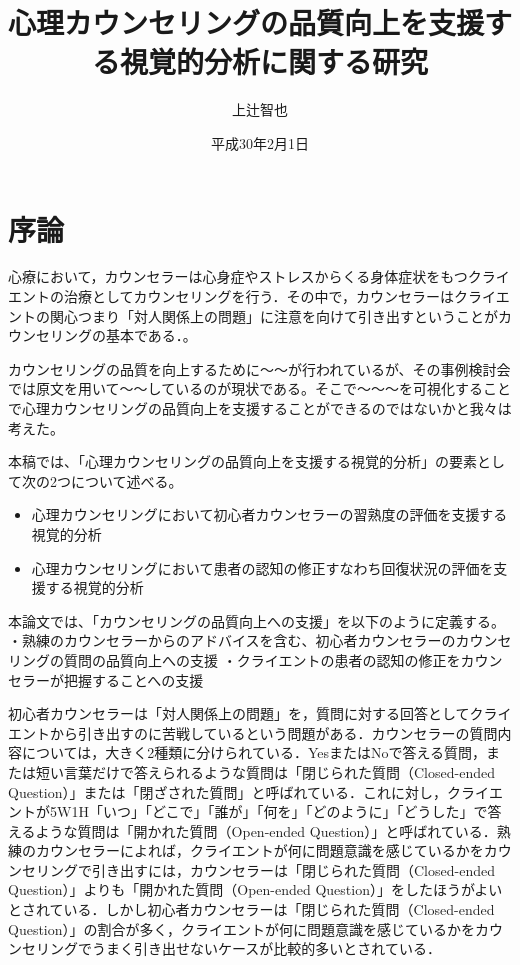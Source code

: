 \documentclass[shuuron]{kuee}
\title{心理カウンセリングの品質向上を支援する視覚的分析に関する研究}
\author{上辻智也}
\date{平成30年2月1日}
\begin{document}
\maketitle
\tableofcontents


\chapter{序論}
心療において，カウンセラーは心身症やストレスからくる身体症状をもつクライエントの治療としてカウンセリングを行う．その中で，カウンセラーはクライエントの関心つまり「対人関係上の問題」に注意を向けて引き出すということがカウンセリングの基本である\cite{zokad}．。




カウンセリングの品質を向上するために〜〜が行われているが、その事例検討会では原文を用いて〜〜しているのが現状である。そこで〜〜〜を可視化することで心理カウンセリングの品質向上を支援することができるのではないかと我々は考えた。

本稿では、「心理カウンセリングの品質向上を支援する視覚的分析」の要素として次の2つについて述べる。
\begin{itemize}
\item 心理カウンセリングにおいて初心者カウンセラーの習熟度の評価を支援する視覚的分析
\item 心理カウンセリングにおいて患者の認知の修正すなわち回復状況の評価を支援する視覚的分析
\end{itemize}



本論文では、「カウンセリングの品質向上への支援」を以下のように定義する。
・熟練のカウンセラーからのアドバイスを含む、初心者カウンセラーのカウンセリングの質問の品質向上への支援
・クライエントの患者の認知の修正をカウンセラーが把握することへの支援




初心者カウンセラーは「対人関係上の問題」を，質問に対する回答としてクライエントから引き出すのに苦戦しているという問題がある．カウンセラーの質問内容については，大きく2種類に分けられている．YesまたはNoで答える質問，または短い言葉だけで答えられるような質問は「閉じられた質問（Closed-ended Question）」または「閉ざされた質問」と呼ばれている．これに対し，クライエントが5W1H「いつ」「どこで」「誰が」「何を」「どのように」「どうした」で答えるような質問は「開かれた質問（Open-ended Question）」と呼ばれている．熟練のカウンセラーによれば，クライエントが何に問題意識を感じているかをカウンセリングで引き出すには，カウンセラーは「閉じられた質問（Closed-ended Question）」よりも「開かれた質問（Open-ended Question）」をしたほうがよいとされている．しかし初心者カウンセラーは「閉じられた質問（Closed-ended Question）」の割合が多く，クライエントが何に問題意識を感じているかをカウンセリングでうまく引き出せないケースが比較的多いとされている．
\end{document}
